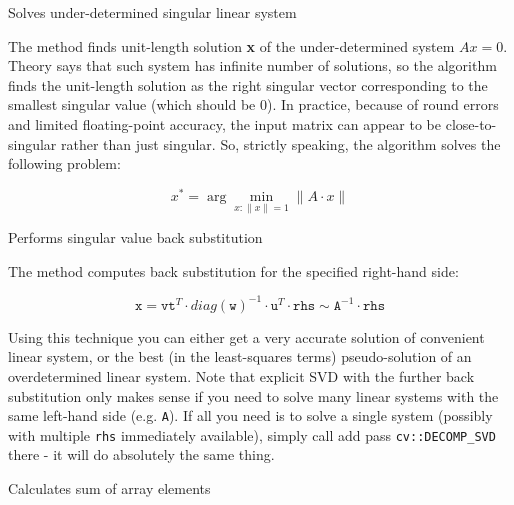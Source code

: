 Solves under-determined singular linear system

\begin{description}
\end{description}

The method finds unit-length solution \textbf{x} of the under-determined system $A x = 0$. Theory says that such system has infinite number of solutions, so the algorithm finds the unit-length solution as the right singular vector corresponding to the smallest singular value (which should be 0). In practice, because of round errors and limited floating-point accuracy, the input matrix can appear to be close-to-singular rather than just singular. So, strictly speaking, the algorithm solves the following problem:

\[
x^* = \arg \min_{x: \|x\|=1} \|A \cdot x \|
\]

Performs singular value back substitution

\begin{description}
\end{description}

The method computes back substitution for the specified right-hand side:

\[
\texttt{x} = \texttt{vt}^T \cdot diag(\texttt{w})^{-1} \cdot \texttt{u}^T \cdot \texttt{rhs} \sim \texttt{A}^{-1} \cdot \texttt{rhs}
\]

Using this technique you can either get a very accurate solution of convenient linear system, or the best (in the least-squares terms) pseudo-solution of an overdetermined linear system. Note that explicit SVD with the further back substitution only makes sense if you need to solve many linear systems with the same left-hand side (e.g. \texttt{A}). If all you need is to solve a single system (possibly with multiple \texttt{rhs} immediately available), simply call  add pass \texttt{cv::DECOMP\_SVD} there - it will do absolutely the same thing. 

Calculates sum of array elements

